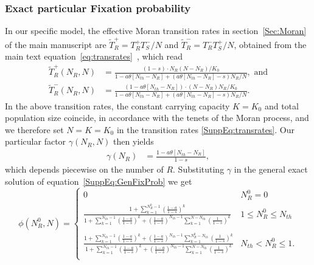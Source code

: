 \documentclass{article}
\begin{document}
\subsubsection{Exact particular Fixation probability}\label{A1.1}
In our specific model, the effective Moran transition rates in section~\ref{Sec:Moran} of the main manuscript are \(\widetilde{T}^+_R=T^+_RT^-_S/N\) and \(\widetilde{T}^-_R=T^-_RT^+_S/N\), obtained from the main text equation~\eqref{eq:transrates}~\cite{wienand2017evolution,wienand2018eco}, which read
\begin{align}
 \widetilde{T}^+_R\left(N_R,N\right)&=\frac{(1-s)\cdot N_R(N-N_R)/K_0}{1-a\theta\left[N_{th}-N_R\right]+(a\theta\left[N_{th}-N_R\right]-s)N_R/N},\text{~and} \nonumber\\
 \widetilde{T}^-_R\left(N_R,N\right)&=\frac{(1-a\theta\left[N_{th}-N_R\right])\cdot(N-N_R)N_R/K_0}{1-a\theta\left[N_{th}-N_R\right]+(a\theta\left[N_{th}-N_R\right]-s)N_R/N}.
\label{SuppEq:transrates}
\end{align}
In the above transition rates, the constant carrying capacity $K=K_0$ and total population size coincide, in accordance with the tenets of the Moran process, and we therefore set \(N=K=K_0\) in the transition rates \eqref{SuppEq:transrates}. Our particular factor \(\gamma\left(N_R,N\right)\) then yields
\begin{align}
 \gamma\left(N_R\right)&=\frac{1-a\theta\left[N_{th}-N_R\right]}{1-s},
\label{SuppEq:gamma}
\end{align}
which depends piecewise on the number of $R$. Substituting \(\gamma\) in the general exact solution of equation~\eqref{SuppEq:GenFixProb} we get
\begin{equation}
\phi(N_R^0,N)=\begin{cases}
                   0 & N_R^0=0\\
                   
                   \frac{1+\sum_{k=1}^{N_R^0-1}\left(\frac{1-a}{1-s}\right)^k}
                   {1+\sum_{k=1}^{N_{th}-1}\left(\frac{1-a}{1-s}\right)^k+\left(\frac{1-a}{1-s}\right)^{N_{th}-1}\sum_{k=1}^{N-N_{th}}\left(\frac{1}{1-s}\right)^k} & 1\leq N_R^0\leq N_{th}\\
                   \\
                   \frac{1+\sum_{k=1}^{N_{th}-1}\left(\frac{1-a}{1-s}\right)^k+\left(\frac{1-a}{1-s}\right)^{N_{th}-1}\sum_{k=1}^{N_R^0-N_{th}}\left(\frac{1}{1-s}\right)^k}
                   {1+\sum_{k=1}^{N_{th}-1}\left(\frac{1-a}{1-s}\right)^k+\left(\frac{1-a}{1-s}\right)^{N_{th}-1}\sum_{k=1}^{N-N_{th}}\left(\frac{1}{1-s}\right)^k} & N_{th}<N_R^0\leq 1. \\
                \end{cases}
    \label{SpecFixProb2}
\end{equation}
\end{document}
